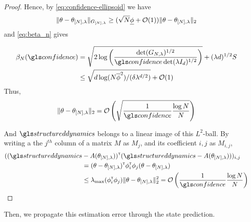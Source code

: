 \begin{subappendices}
\begin{proof}
		Hence, by \eqref{eq:confidence-ellipsoid} we have 
		\begin{align*}
		\|\theta - \theta_{[N],\lambda}\|_{G_{[N],\lambda}} \geq (\sqrt{N}\underline{\phi} + \mathcal{O}(1))\|\theta - \theta_{[N],\lambda}\|_{2}
		\end{align*}
		and \eqref{eq:beta_n} gives
		
		\begin{align*}
		\beta_N(\confidence) &= \sqrt{2\log \left(\frac{\det(G_{N,\lambda})^{1/2}}{\confidence\det(\lambda I_d)^{1/2}}\right)}
		+ (\lambda d)^{1/2}S\\
		&\leq \sqrt{d\log (N\overline{\phi}^2) / (\delta\lambda^{d/2})} + \cO(1)
		\end{align*}
		Thus,
		\[\|\theta - \theta_{[N],\lambda}\|_{2} = \cO\left( \sqrt{\frac{1}{\confidence}\frac{\log N}{N}} \right) \]
		
		And $\structureddynamics$ belongs to a linear image of this $L^2$-ball. By writing a the $j^{th}$ column of a matrix $M$ as $M_j$, and its coefficient $i,j$ as $M_{i,j}$,
		\begin{align*}
		((\structureddynamics&-A(\theta_{[N],\lambda}))^\transp (\structureddynamics - A(\theta_{[N],\lambda})))_{i,j}\\
		&= (\theta-\theta_{[N],\lambda})^\transp\phi_{i}^{\transp}\phi_j(\theta-\theta_{[N],\lambda}) \\
		&\leq \lambda_{\max}(\phi_{i}^{\transp}\phi_j) \|\theta - \theta_{[N],\lambda}\|_{2}^2 = \cO\left( {\frac{1}{\confidence}\frac{\log N}{N}} \right) 
		\end{align*}
		
	\end{proof}
	
	Then, we propagate this estimation error through the state prediction.
	

\end{subappendices}
